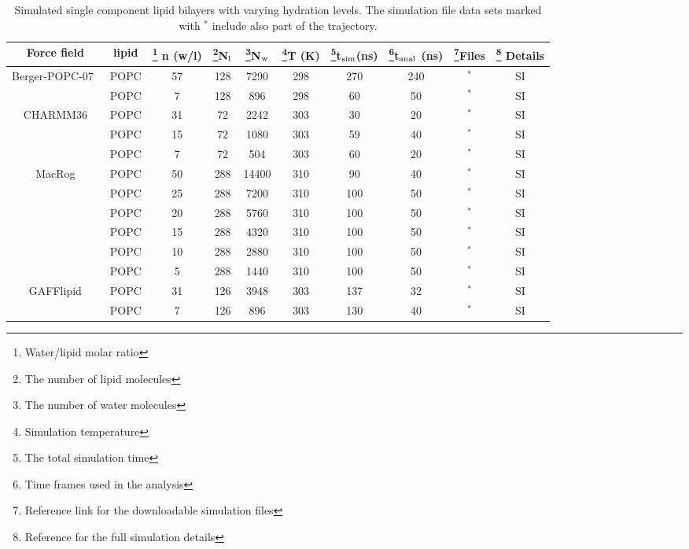 \documentclass[pre,aps,floatfix,authordate1-4,twocolumn]{revtex4-1}
\begin{document}
\begin{table}[htb]
\centering
\caption{Simulated single component lipid bilayers with varying hydration levels. The simulation file data sets marked with $^*$ include also part of the trajectory.
}\label{systemsDEHYD}
\begin{tabular}{c c c c c c c c c c}
Force field & lipid & \footnote{Water/lipid molar ratio} n (w/l)   & \footnote{The number of lipid molecules}N$_{\rm l}$   &  \footnote{The number of water molecules}N$_{\rm w}$ & \footnote{Simulation temperature}T (K)  & \footnote{The total simulation time}t$_{{\rm sim}}$(ns)  & \footnote{Time frames used in the analysis}t$_{{\rm anal}}$ (ns)& \footnote{Reference link for the downloadable simulation files}Files  &  \footnote{Reference for the full simulation details} Details\\
\hline
Berger-POPC-07~\cite{ollila07a}          &   POPC & 57  &128 & 7290  & 298  & 270 & 240 & \cite{bergerFILESpopc}$^*$ & SI \\
                                        &   POPC & 7  &128 & 896   & 298  & 60 & 50 & \cite{bergerDEHYDfiles}$^*$ & SI \\
CHARMM36\cite{klauda10}              & POPC   & 31 & 72  &  2242 & 303 & 30 & 20 & \cite{charmm36filesSHORT}$^*$ & SI \\
                               & POPC   & 15 & 72 &  1080  & 303 & 59 & 40 & \cite{charmm36files15wPERl}$^*$ & SI \\
                            & POPC   & 7  & 72  &  504  & 303 & 60 & 20 & \cite{charmm36files7wPERl}$^*$ & SI \\
MacRog\cite{maciejewski14}     & POPC   & 50 & 288  & 14400 & 310 & 90 & 40 & \cite{macrogdehydFILES}$^*$ & SI \\
                               & POPC   & 25 & 288  & 7200 & 310 & 100 & 50 & \cite{macrogdehydFILES}$^*$ & SI \\
                                & POPC   & 20 & 288  & 5760 & 310 & 100 & 50 & \cite{macrogdehydFILES}$^*$ & SI \\
                                & POPC   & 15 & 288  & 4320 & 310 & 100 & 50 & \cite{macrogdehydFILES}$^*$ & SI \\
                                & POPC   & 10 & 288  & 2880 & 310 & 100 & 50 & \cite{macrogdehydFILES}$^*$ & SI \\
                                & POPC   & 5 & 288   & 1440 & 310 & 100 & 50 & \cite{macrogdehydFILES}$^*$ & SI \\
GAFFlipid\cite{dickson12}      & POPC   & 31& 126  & 3948  & 303 & 137 & 32 & \cite{GAFFlipidFILES}$^*$ & SI  \\
                               & POPC   & 7& 126  & 896   & 303 & 130 & 40 & \cite{gaffDEHYDfiles}$^*$ & SI \\
\end{tabular}
\end{table} 
\end{document}
